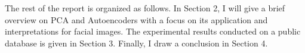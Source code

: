 The rest of the report is organized as follows. In Section 2, I will give a
brief overview on PCA and Autoencoders with a focus on its application and
interpretations for facial images. The experimental results conducted on a
public database is given in Section 3. Finally, I draw a conclusion in Section
4.
